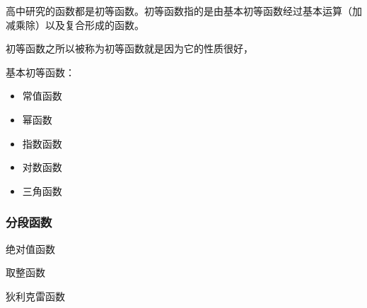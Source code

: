 高中研究的函数都是初等函数。初等函数指的是由基本初等函数经过基本运算（加减乘除）以及复合形成的函数。

初等函数之所以被称为初等函数就是因为它的性质很好，

基本初等函数：
\begin{itemize}
\item 常值函数
\item 幂函数
\item 指数函数
\item 对数函数
\item 三角函数
\end{itemize}

\subsubsection{分段函数}

绝对值函数

取整函数

狄利克雷函数